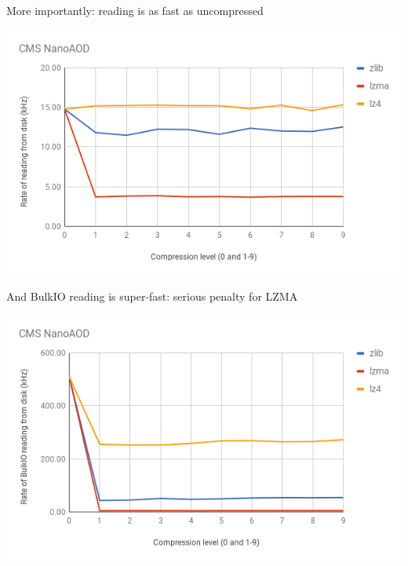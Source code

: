 \documentclass[aspectratio=169]{beamer}
\begin{document}
\begin{frame}{More importantly: reading is as fast as uncompressed}
\vspace{0.1 cm}
\begin{center}
\includegraphics[width=0.9\linewidth]{read-vs-compression.png}
\end{center}
\end{frame}

\begin{frame}{And BulkIO reading is super-fast: serious penalty for LZMA}
\vspace{0.1 cm}
\begin{center}
\includegraphics[width=0.9\linewidth]{bulk-vs-compression.png}
\end{center}
\end{frame}
\end{document}
